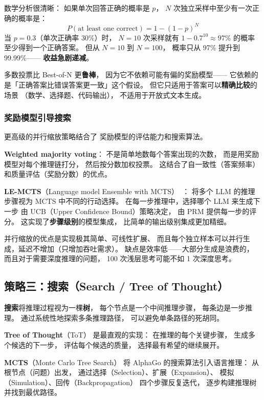 数学分析很清晰：
如果单次回答正确的概率是 $p$，
$N$ 次独立采样中至少有一次正确的概率是：
\begin{equation}
  P(\text{at least one correct}) = 1 - (1-p)^N
\end{equation}
当 $p = 0.3$（单次正确率 30\%）时，
$N = 10$ 次采样就有 $1 - 0.7^{10} \approx 97\%$ 的概率
至少得到一个正确答案。
但从 $N = 10$ 到 $N = 100$，
概率只从 97\% 提升到 99.99\%——
\textbf{收益急剧递减}。

多数投票比 Best-of-N 更\textbf{鲁棒}，
因为它不依赖可能有偏的奖励模型——
它依赖的是「正确答案比错误答案更一致」这个假设。
但它只适用于答案可以\textbf{精确比较}的场景
（数学、选择题、代码输出），
不适用于开放式文本生成。

\subsubsection{奖励模型引导搜索}

更高级的并行缩放策略结合了
奖励模型的评估能力和搜索算法。

\textbf{Weighted majority voting}：
不是简单地数每个答案出现的次数，
而是用奖励模型对每个推理链打分，
然后按分数加权投票。
这结合了自一致性（答案频率）
和质量评估（奖励分数）的优点。

\textbf{LE-MCTS}（Language model Ensemble with MCTS）~\cite{park2025lemcts}：
将多个 LLM 的推理步骤视为
MCTS 中不同的行动选择。
在每一步推理中，选择哪个 LLM 来生成下一步
由 UCB（Upper Confidence Bound）策略决定，
由 PRM 提供每一步的评分。
这实现了\textbf{步骤级别}的模型集成，
比简单的输出级别集成更加精细。

并行缩放的优点是实现极其简单、可线性扩展、
而且每个独立样本可以并行生成，延迟不增加（只增加吞吐需求）。
缺点是效率低——大部分生成是浪费的，
而且对于需要深度推理的问题，
100 次浅层思考可能不如 1 次深度思考。

\subsection{策略三：搜索（Search / Tree of Thought）}

\textbf{搜索}将推理过程视为一棵\textbf{树}，
每个节点是一个中间推理步骤，
每条边是一步推理。
通过系统性地探索多条推理路径，
可以避免单条路径的死胡同。

\textbf{Tree of Thought}（ToT）
是最直观的实现：
在推理的每个关键步骤，
生成多个候选的下一步，
评估每个候选的质量，
选择最有希望的继续展开。

\textbf{MCTS}（Monte Carlo Tree Search）
将 AlphaGo 的搜索算法引入语言推理：
从根节点（问题）出发，
通过选择（Selection）、扩展（Expansion）、
模拟（Simulation）、回传（Backpropagation）
四个步骤反复迭代，
逐步构建推理树并找到最优路径。


